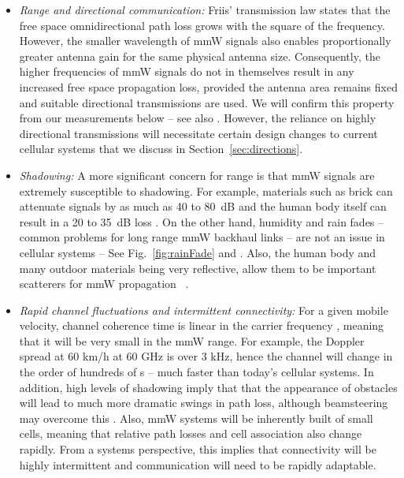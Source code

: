 \documentclass[journal]{IEEEtran}
\begin{document}
\begin{itemize}
\item \emph{Range and directional communication:}
Friis' transmission law \cite{Rappaport:02} states that the free space
omnidirectional path loss grows with the square of the frequency.
However, the smaller wavelength of mmW signals also enables proportionally greater
antenna gain for the same physical antenna size.  Consequently,
the higher frequencies of mmW signals do not in themselves result in any
increased free space propagation loss, provided
the antenna area remains fixed
and suitable directional transmissions are used.  We will confirm this property
from our measurements below -- see also \cite{Sun-Beam:13}.
However, the reliance on highly directional transmissions will necessitate
certain design changes to current cellular systems
that we discuss in Section~\ref{sec:directions}.

\item \emph{Shadowing:}
A more significant concern for range is that
mmW signals are extremely susceptible to shadowing.  For example,
materials such as brick can attenuate signals by as much as 40 to
80~dB\cite{Allen:94,Anderson04,Alejos:08,KhanPi:11-CommMag,Rappaport:28NYCPenetrationLoss}
and the human body itself can result in a 20 to 35~dB loss \cite{LuSCP:12}.
On the other hand, humidity and rain fades -- common problems for long range
mmW backhaul links -- are not an issue in cellular systems
-- See Fig.~\ref{fig:rainFade} and \cite{Ted:60Gstate11,rappaportmillimeter}.
Also, the human body and many outdoor materials
being very reflective, allow
them to be important scatterers for mmW propagation~
\cite{ben2011millimeter,Rappaport:28NYCPenetrationLoss}.

\item \emph{Rapid channel fluctuations and intermittent connectivity:}
For a given mobile velocity, channel  coherence time is
linear in the carrier frequency \cite{Rappaport:02}, meaning that it will be very small
in the mmW range.  For example, the Doppler spread at
60 km/h at 60 GHz is over 3 kHz, hence the channel will change in the order of hundreds of s
-- much faster than today's cellular systems.  In addition, high levels of shadowing imply
that that the appearance of obstacles will lead to much more dramatic swings in path loss,
although beamsteering may overcome this \cite{rappaportmillimeter}.
Also, mmW systems will be inherently built of small cells,
 meaning that relative path losses
and cell association also change rapidly.
From a systems perspective, this implies that connectivity will be highly intermittent
and communication will need to be rapidly adaptable.


\end{itemize}
\end{document}
